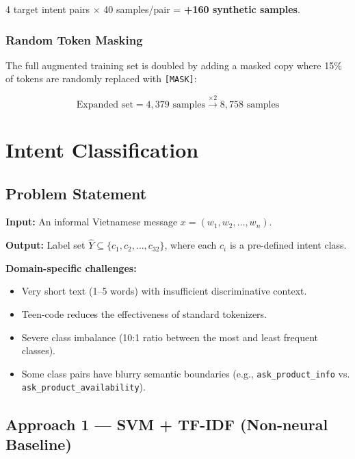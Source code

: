 \documentclass[12pt, a4paper]{report}
\begin{document}
4 target intent pairs $\times$ 40 samples/pair = \textbf{+160 synthetic samples}.

\subsection{Random Token Masking}

The full augmented training set is doubled by adding a masked copy
where 15\% of tokens are randomly replaced with \texttt{[MASK]}:

\begin{equation}
  \text{Expanded set} = 4{,}379 \text{ samples} \xrightarrow{\times 2} 8{,}758 \text{ samples}
\end{equation}

\chapter{Intent Classification}

\section{Problem Statement}

\textbf{Input:} An informal Vietnamese message
$x = (w_1, w_2, \ldots, w_n)$.

\textbf{Output:} Label set $\hat{Y} \subseteq \{c_1, c_2, \ldots, c_{32}\}$,
where each $c_i$ is a pre-defined intent class.

\textbf{Domain-specific challenges:}
\begin{itemize}
  \item Very short text (1--5 words) with insufficient discriminative context.
  \item Teen-code reduces the effectiveness of standard tokenizers.
  \item Severe class imbalance (10:1 ratio between the most and least frequent classes).
  \item Some class pairs have blurry semantic boundaries
        (e.g., \texttt{ask\_product\_info} vs. \texttt{ask\_product\_availability}).
\end{itemize}

\section{Approach 1 --- SVM + TF-IDF (Non-neural Baseline)}
\end{document}
